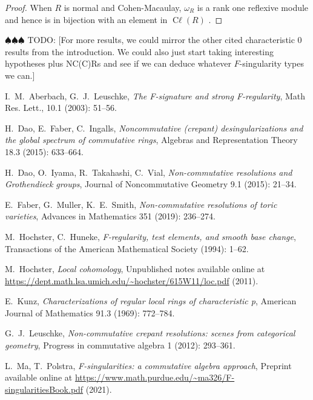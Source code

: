 \documentclass{amsart}
\theoremstyle{definition}
\DeclareMathOperator{\Cl}{\operatorname{C\ell}}
\newcommand{\todo}[1]{{\color{teal} \sf $\spadesuit\spadesuit\spadesuit$ TODO: [#1]}}
\begin{document}
\begin{proof}
When $R$ is normal and Cohen-Macaulay, $\omega_{R}$ is a rank one reflexive module and hence is in bijection with an element in $\Cl(R)$ \cite[(14.10)]{Hoc11}. 
\end{proof}

\bigbreak

\todo{For more results, we could mirror the other cited characteristic $0$ results from the introduction. We could also just start taking interesting hypotheses plus NC(C)Rs and see if we can deduce whatever $F$-singularity types we can.}

\begin{thebibliography}{99}

 I.\ M.\ Aberbach, G.\ J.\ Leuschke, \emph{The F-signature and strong F-regularity}, Math Res. Lett., 10.1 (2003): 51--56.

 H.\ Dao, E.\ Faber, C.\ Ingalls, \emph{Noncommutative (crepant) desingularizations and the global spectrum of commutative rings}, Algebras and Representation Theory 18.3 (2015): 633--664.

 H.\ Dao, O.\ Iyama, R.\ Takahashi, C.\ Vial, \emph{Non-commutative resolutions and Grothendieck groups}, Journal of Noncommutative Geometry 9.1 (2015): 21--34.

 E.\ Faber, G.\ Muller, K.\ E.\ Smith, \emph{Non-commutative resolutions of toric varieties}, Advances in Mathematics 351 (2019): 236--274.

 M.\ Hochster, C.\ Huneke, \emph{F-regularity, test elements, and smooth base change}, Transactions of the American Mathematical Society (1994): 1--62.

 M.\ Hochster, \emph{Local cohomology}, Unpublished notes available online at \mbox{\url{https://dept.math.lsa.umich.edu/~hochster/615W11/loc.pdf}} (2011).

 E.\ Kunz, \emph{Characterizations of regular local rings of characteristic p}, American Journal of Mathematics 91.3 (1969): 772--784.

 G.\ J.\ Leuschke, \emph{Non-commutative crepant resolutions: scenes from categorical geometry}, Progress in commutative algebra 1 (2012): 293--361.

 L.\ Ma, T.\ Polstra, \emph{F-singularities: a commutative algebra approach}, Preprint available online at \mbox{\url{https://www.math.purdue.edu/\~ma326/F-singularitiesBook.pdf}} (2021).


\end{thebibliography}
\end{document}
